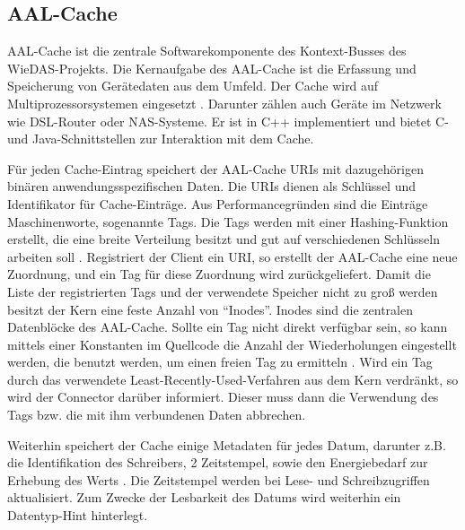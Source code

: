 \subsection{AAL-Cache}
\label{gru_aalcache}

AAL-Cache ist die zentrale Softwarekomponente des Kontext-Busses des WieDAS-Projekts.
Die Kernaufgabe des AAL-Cache ist die Erfassung und Speicherung von Gerätedaten aus dem Umfeld.
Der Cache wird auf Multiprozessorsystemen eingesetzt \cite{aalcache}.
Darunter zählen auch Geräte im Netzwerk wie DSL-Router oder NAS-Systeme.
Er ist in C++ implementiert und bietet C- und Java-Schnittstellen zur Interaktion mit dem Cache.

Für jeden Cache-Eintrag speichert der AAL-Cache URIs mit dazugehörigen binären anwendungsspezifischen
Daten.
Die URIs dienen als Schlüssel und Identifikator für Cache-Einträge.
Aus Performancegründen sind die Einträge Maschinenworte, sogenannte Tags.
Die Tags werden mit einer Hashing-Funktion erstellt, die eine breite Verteilung besitzt
und gut auf verschiedenen Schlüsseln arbeiten soll \cite{aalc_hash}.
Registriert der Client ein URI, so erstellt der AAL-Cache eine neue Zuordnung, und ein Tag
für diese Zuordnung wird zurückgeliefert.
Damit die Liste der registrierten Tags und der verwendete Speicher nicht zu groß werden
besitzt der Kern eine feste Anzahl von ``Inodes''.
Inodes sind die zentralen Datenblöcke des AAL-Cache.
Sollte ein Tag nicht direkt verfügbar sein, so kann mittels einer Konstanten im Quellcode
die Anzahl der Wiederholungen eingestellt werden, die benutzt werden, um einen freien Tag zu ermitteln
\cite{aalcache}.
Wird ein Tag durch das verwendete Least-Recently-Used-Verfahren aus dem Kern verdränkt, so wird
der Connector darüber informiert.
Dieser muss dann die Verwendung des Tags bzw. die mit ihm verbundenen Daten abbrechen.

Weiterhin speichert der Cache einige Metadaten für jedes Datum, darunter z.B. die Identifikation
des Schreibers, 2 Zeitstempel, sowie den Energiebedarf zur Erhebung des Werts \cite{aalcache}.
Die Zeitstempel werden bei Lese- und Schreibzugriffen aktualisiert.
Zum Zwecke der Lesbarkeit des Datums wird weiterhin ein Datentyp-Hint hinterlegt.

